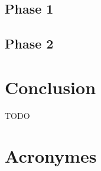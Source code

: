 \documentclass[12pt,a4paper]{article}
\begin{document}
\subsection{Phase 1}



\subsection{Phase 2}

\section{Conclusion}

TODO


\newpage
\section*{Acronymes}

\begin{acronym}
\end{acronym}
\end{document}
